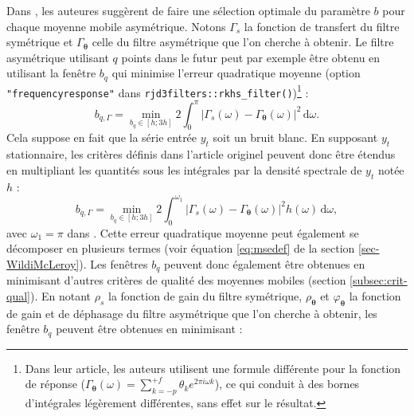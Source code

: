 \documentclass[
  12pt,
  a4paper,french]{article}
\newcommand\1{\mathds{1}}
\newcommand\ud{\,\mathrm{d}}
\begin{document}
Dans \textcite{dagumbianconcini2015new}, les auteures suggèrent de faire une sélection optimale du paramètre \(b\) pour chaque moyenne mobile asymétrique.
Notons \(\Gamma_s\) la fonction de transfert du filtre symétrique et \(\Gamma_{\boldsymbol\theta}\) celle du filtre asymétrique que l'on cherche à obtenir.
Le filtre asymétrique utilisant \(q\) points dans le futur peut par exemple être obtenu en utilisant la fenêtre \(b_q\) qui minimise l'erreur quadratique moyenne (option \texttt{"frequencyresponse"} dans \texttt{rjd3filters::rkhs\_filter()})\footnote{
  Dans leur article, les auteurs utilisent une formule différente pour la fonction de réponse (\(\Gamma_{\boldsymbol\theta}(\omega)=\sum_{k=-p}^{+f} \theta_k e^{2\pi i \omega k}\)), ce qui conduit à des bornes d'intégrales légèrement différentes, sans effet sur le résultat.} :
\[
b_{q,\Gamma}=\underset{b_q\in[h; 3h]}{\min}
2\int_{0}^{\pi}
\lvert \Gamma_s(\omega)-\Gamma_{\boldsymbol\theta}(\omega)\rvert^2\ud \omega.
\]
Cela suppose en fait que la série entrée \(y_t\) soit un bruit blanc.
En supposant \(y_t\) stationnaire, les critères définis dans l'article originel peuvent donc être étendus en multipliant les quantités sous les intégrales par la densité spectrale de \(y_t\) notée \(h\) :
\[
b_{q,\Gamma}=\underset{b_q\in[h; 3h]}{\min}
2\int_{0}^{\omega_1}
\lvert \Gamma_s(\omega)-\Gamma_{\boldsymbol\theta}(\omega)\rvert^2h(\omega)\ud \omega,
\]
avec \(\omega_1 = \pi\) dans \textcite{dagumbianconcini2015new}.
Cette erreur quadratique moyenne peut également se décomposer en plusieurs termes (voir équation \eqref{eq:msedef} de la section \ref{sec-WildiMcLeroy}).
Les fenêtres \(b_q\) peuvent donc également être obtenues en minimisant d'autres critères de qualité des moyennes mobiles (section \ref{subsec:crit-qual}).
En notant \(\rho_s\) la fonction de gain du filtre symétrique, \(\rho_{\boldsymbol\theta}\) et \(\varphi_{\boldsymbol\theta}\) la fonction de gain et de déphasage du filtre asymétrique que l'on cherche à obtenir, les fenêtre \(b_q\) peuvent être obtenues en minimisant :
\end{document}
